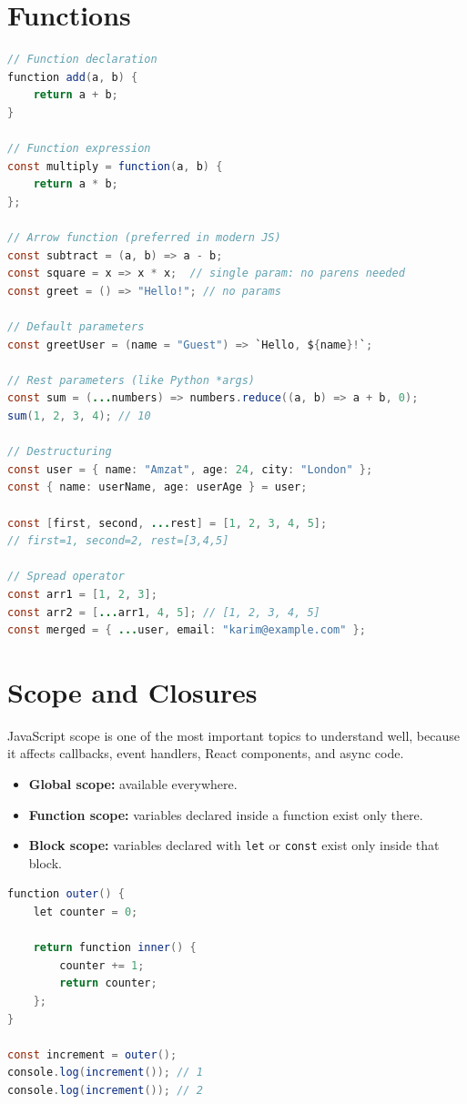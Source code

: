\documentclass[12pt, a4paper, oneside]{book}
\begin{document}
\section{Functions}

\begin{lstlisting}[language=Java, caption={JavaScript functions}]
// Function declaration
function add(a, b) {
    return a + b;
}

// Function expression
const multiply = function(a, b) {
    return a * b;
};

// Arrow function (preferred in modern JS)
const subtract = (a, b) => a - b;
const square = x => x * x;  // single param: no parens needed
const greet = () => "Hello!"; // no params

// Default parameters
const greetUser = (name = "Guest") => `Hello, ${name}!`;

// Rest parameters (like Python *args)
const sum = (...numbers) => numbers.reduce((a, b) => a + b, 0);
sum(1, 2, 3, 4); // 10

// Destructuring
const user = { name: "Amzat", age: 24, city: "London" };
const { name: userName, age: userAge } = user;

const [first, second, ...rest] = [1, 2, 3, 4, 5];
// first=1, second=2, rest=[3,4,5]

// Spread operator
const arr1 = [1, 2, 3];
const arr2 = [...arr1, 4, 5]; // [1, 2, 3, 4, 5]
const merged = { ...user, email: "karim@example.com" };
\end{lstlisting}

\section{Scope and Closures}

JavaScript scope is one of the most important topics to understand well, because it affects callbacks, event handlers, React components, and async code.

\begin{itemize}[leftmargin=2em]
    \item \textbf{Global scope:} available everywhere.
    \item \textbf{Function scope:} variables declared inside a function exist only there.
    \item \textbf{Block scope:} variables declared with \texttt{let} or \texttt{const} exist only inside that block.
\end{itemize}

\begin{lstlisting}[language=Java, caption={Scope and closure basics}]
function outer() {
    let counter = 0;

    return function inner() {
        counter += 1;
        return counter;
    };
}

const increment = outer();
console.log(increment()); // 1
console.log(increment()); // 2
\end{lstlisting}
\end{document}
